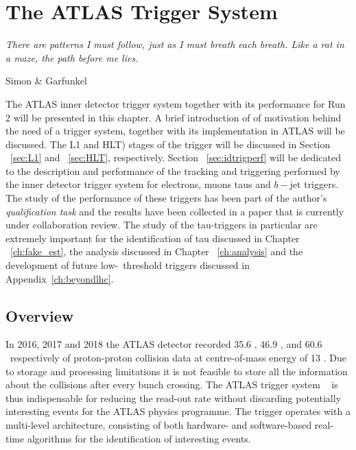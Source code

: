 \chapter{The ATLAS Trigger System}
\label{ch:trigger}
\epigraph{\emph{There are patterns I must follow, just as I must breath each breath. Like a rat in a maze, the path before me lies.}}{Simon \& Garfunkel}
The \ac{ATLAS} inner detector trigger system together with its performance for Run 2 will be presented in this chapter. 
	A brief introduction of of motivation behind the need of a trigger system, together with its implementation in \ac{ATLAS} will be discussed.
	The \ac{L1} and \ac{HLT}) stages of the trigger will be discussed in Section ~\ref{sec:L1} and ~\ref{sec:HLT}, respectively. 
	Section ~\ref{sec:idtrigperf} will be dedicated to the description and performance of the tracking and triggering performed by the inner detector trigger system for electrons, muons taus and $b-$jet triggers. 
	The study of the performance of these triggers has been part of the author's \textit{qualification task} and the results have been collected in a paper that is currently under collaboration review.
	The study of the tau-triggers in particular are extremely important for the identification of tau discussed in Chapter ~\ref{ch:fake_est}, the analysis discussed in Chapter ~\ref{ch:analysis} and the development of future low-\pt\ threshold triggers discussed in Appendix~\ref{ch:beyondlhc}.	
	
	\section{Overview}
	\label{sec:Trig_intro}
	In 2016, 2017 and 2018 the \ac{ATLAS} detector recorded 35.6 \infb, 46.9 \infb, and 60.6 \infb\ respectively of proton-proton collision data at centre-of-mass energy of 13 \tev. 
	Due to storage and processing limitations it is not feasible  to store all the information about the collisions after every bunch crossing. 
	The ATLAS trigger system ~\cite{ATLASTrigger2015,Sutton:2695048} is thus indispensable for reducing the read-out rate without discarding potentially interesting events for the \ac{ATLAS} physics programme. 
	The trigger operates with a multi-level architecture, consisting of both hardware- and software-based real-time algorithms for the identification of interesting events. 

